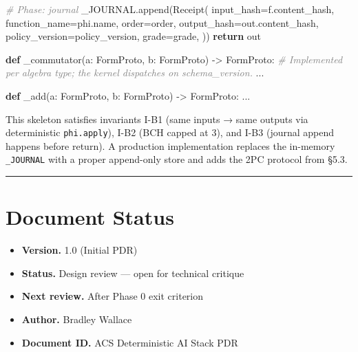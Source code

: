 \documentclass[11pt,a4paper]{article}
\newenvironment{Shaded}{\begin{snugshade}\small}{\end{snugshade}}
\newcommand{\KeywordTok}[1]{\textbf{#1}}
\newcommand{\CommentTok}[1]{\textit{\textcolor{gray}{#1}}}
\newcommand{\ControlFlowTok}[1]{\textbf{#1}}
\newcommand{\OperatorTok}[1]{#1}
\newcommand{\NormalTok}[1]{#1}
\providecommand{\tightlist}{\setlength{\itemsep}{0pt}\setlength{\parskip}{0pt}}
\begin{document}
\begin{Shaded}
\begin{Highlighting}[]
    \CommentTok{\# Phase: journal}
\NormalTok{    \_JOURNAL.append(Receipt(}
\NormalTok{        input\_hash}\OperatorTok{=}\NormalTok{f.content\_hash,}
\NormalTok{        function\_name}\OperatorTok{=}\NormalTok{phi.name,}
\NormalTok{        order}\OperatorTok{=}\NormalTok{order,}
\NormalTok{        output\_hash}\OperatorTok{=}\NormalTok{out.content\_hash,}
\NormalTok{        policy\_version}\OperatorTok{=}\NormalTok{policy\_version,}
\NormalTok{        grade}\OperatorTok{=}\NormalTok{grade,}
\NormalTok{    ))}
    \ControlFlowTok{return}\NormalTok{ out}

\KeywordTok{def}\NormalTok{ \_commutator(a: FormProto, b: FormProto) }\OperatorTok{{-}\textgreater{}}\NormalTok{ FormProto:}
    \CommentTok{\# Implemented per algebra type; the kernel dispatches on schema\_version.}
\NormalTok{    ...}

\KeywordTok{def}\NormalTok{ \_add(a: FormProto, b: FormProto) }\OperatorTok{{-}\textgreater{}}\NormalTok{ FormProto:}
\NormalTok{    ...}
\end{Highlighting}
\end{Shaded}

This skeleton satisfies invariants I-B1 (same inputs → same outputs via
deterministic \texttt{phi.apply}), I-B2 (BCH capped at 3), and I-B3
(journal append happens before return). A production implementation
replaces the in-memory \texttt{\_JOURNAL} with a proper append-only
store and adds the 2PC protocol from §5.3.

\begin{center}\rule{0.5\linewidth}{0.5pt}\end{center}

\hypertarget{document-status}{%
\section{Document Status}\label{document-status}}

\begin{itemize}
\tightlist
\item
  \textbf{Version.} 1.0 (Initial PDR)
\item
  \textbf{Status.} Design review --- open for technical critique
\item
  \textbf{Next review.} After Phase 0 exit criterion
\item
  \textbf{Author.} Bradley Wallace
\item
  \textbf{Document ID.} ACS Deterministic AI Stack PDR
\end{itemize}
\end{document}
